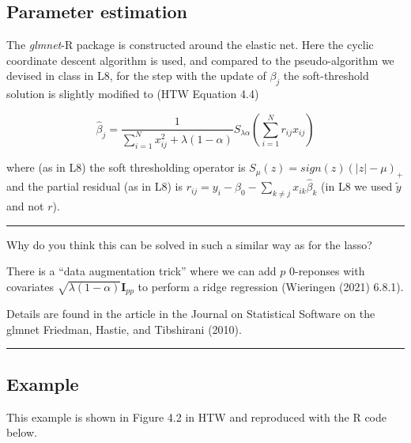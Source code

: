 \documentclass[
  letterpaper,
  DIV=11,
  numbers=noendperiod]{scrartcl}
\begin{document}
\hypertarget{parameter-estimation}{%
\subsection{Parameter estimation}\label{parameter-estimation}}

The \emph{glmnet}-R package is constructed around the elastic net. Here
the cyclic coordinate descent algorithm is used, and compared to the
pseudo-algorithm we devised in class in L8, for the step with the update
of \(\beta_j\) the soft-threshold solution is slightly modified to (HTW
Equation 4.4)

\[\hat{\beta}_j=\frac{1}{\sum_{i=1}^N x_{ij}^2+\lambda (1-\alpha)} S_{\lambda \alpha}(\sum_{i=1}^N r_{ij}x_{ij})\]

where (as in L8) the soft thresholding operator is
\(S_{\mu}(z)=sign(z)(\lvert z \rvert -\mu)_{+}\) and the partial
residual (as in L8) is
\(r_{ij}=y_i-\beta_0-\sum_{k\neq j} x_{ik}\hat{\beta}_k\) (in L8 we used
\(\tilde{y}\) and not \(r\)).

\begin{center}\rule{0.5\linewidth}{0.5pt}\end{center}

Why do you think this can be solved in such a similar way as for the
lasso?

There is a ``data augmentation trick'' where we can add \(p\) 0-reponses
with covariates \(\sqrt{\lambda (1-\alpha)} \boldsymbol I_{pp}\) to
perform a ridge regression (Wieringen (2021) 6.8.1).

Details are found in the article in the Journal on Statistical Software
on the glmnet Friedman, Hastie, and Tibshirani (2010).

\begin{center}\rule{0.5\linewidth}{0.5pt}\end{center}

\hypertarget{example}{%
\subsection{Example}\label{example}}

This example is shown in Figure 4.2 in HTW and reproduced with the R
code below.
\end{document}
